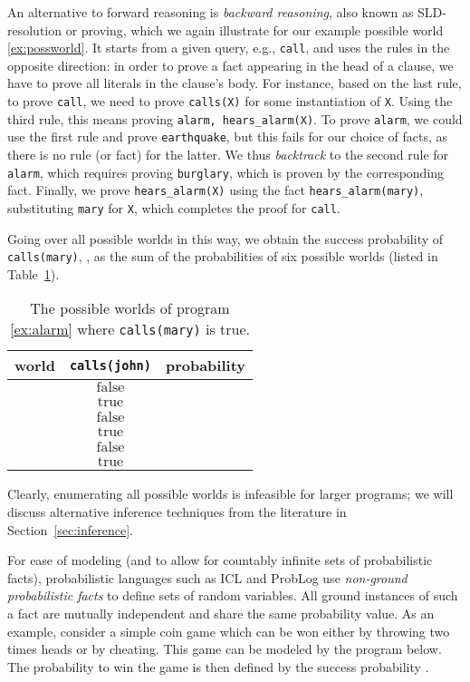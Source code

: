\documentclass[a4paper]{article}
\newcommand{\true}{\ensuremath{\mathrm{true}}}
\newcommand{\false}{\ensuremath{\mathrm{false}}}
\begin{document}
An alternative to forward reasoning is \emph{backward reasoning}, also
known as SLD-resolution or proving, which we again illustrate for our
example possible world \eqref{ex:possworld}. \label{bw-example} It 
starts from a given query, e.g., \verb|call|, and uses the rules in
the opposite direction: in order to prove a fact appearing in the head
of a clause, we have to prove all literals in the clause's body. For
instance, based on the last rule, to prove \verb|call|, we need to
prove \verb|calls(X)| for some instantiation of \verb|X|. Using the
third rule, this means proving \verb|alarm, hears_alarm(X)|. To prove
\verb|alarm|, we could use the first rule and prove \verb|earthquake|,
but this fails for our choice of facts, as there is no rule (or fact) for the
latter. We thus \emph{backtrack} to the second rule for \verb|alarm|,
which requires proving \verb|burglary|, which is proven by the
corresponding fact. Finally, we prove \verb|hears_alarm(X)| using the
fact \verb|hears_alarm(mary)|, substituting \verb|mary| for \verb|X|,
which completes the proof for \verb|call|. 

Going over all possible worlds
in this way, we obtain the success probability of
\verb|calls(mary)|, , as the sum of the probabilities of six possible
worlds (listed in Table~\ref{tab:marycalls}).
\begin{table}[t]
\centering
\begin{tabular}{l|c|r}
 world &  \verb|calls(john)|  &   probability\\\hline
  &  \false   &  \\
  & \true  &   \\
  &  \false   &  \\
  &  \true  &  \\
  & \false   &  \\
  &  \true   & 
\end{tabular}
\caption{The possible worlds of program \eqref{ex:alarm} where
  \texttt{calls(mary)} is true. }
\label{tab:marycalls}
\end{table} 


Clearly, enumerating all possible worlds is infeasible for larger
programs; we will discuss alternative inference techniques from the
literature in Section~\ref{sec:inference}.


For ease of modeling (and to allow for countably infinite sets of
probabilistic facts), probabilistic languages such as ICL and ProbLog   use \emph{non-ground probabilistic facts} to define sets of random variables. All ground instances of such a fact are mutually independent and share the same probability value. 
As an example, consider a simple coin game which can be won either by throwing two times heads or by cheating. This game can be modeled by the program below. The probability to win the game is then defined by the success probability .
\end{document}
